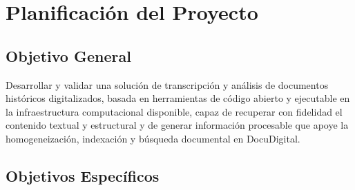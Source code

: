 \section{Planificación del Proyecto}
\label{sec:planificacion}


\subsection{Objetivo General}
\label{subsec:objetivo_general}

Desarrollar y validar una solución de transcripción y análisis de documentos históricos digitalizados, basada en herramientas de código abierto y ejecutable en la infraestructura computacional disponible, capaz de recuperar con fidelidad el contenido textual y estructural y de generar información procesable que apoye la homogeneización, indexación y búsqueda documental en DocuDigital.

\subsection{Objetivos Específicos}
\label{subsec:objetivos_especificos}

